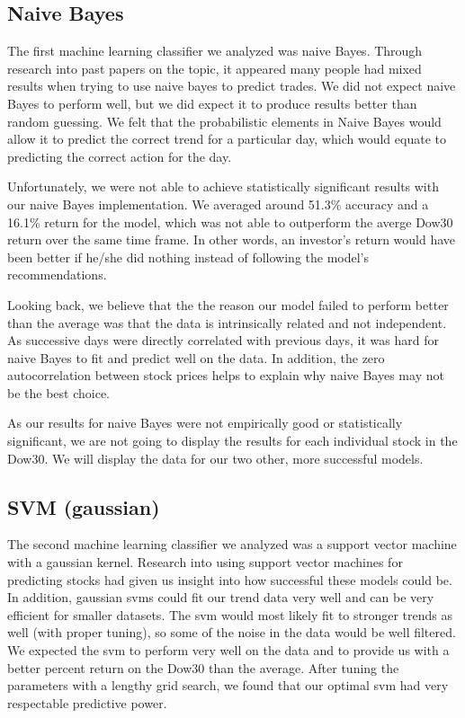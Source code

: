 \documentclass{article}
\begin{document}
\subsection{Naive Bayes}
The first machine learning classifier we analyzed was naive Bayes. Through research into past papers on the topic, it appeared many people had mixed results when trying to use naive bayes to predict trades. We did not expect naive Bayes to perform well, but we did expect it to produce results better than random guessing. We felt that the probabilistic elements in Naive Bayes would allow it to predict the correct trend for a particular day, which would equate to predicting the correct action for the day.

Unfortunately, we were not able to achieve statistically significant results with our naive Bayes implementation. We averaged around 51.3\% accuracy and a 16.1\% return for the model, which was not able to outperform the averge Dow30 return over the same time frame. In other words, an investor's return would have been better if he/she did nothing instead of following the model's recommendations.

Looking back, we believe that the the reason our model failed to perform better than the average was that the data is intrinsically related and not independent. As successive days were directly correlated with previous days, it was hard for naive Bayes to fit and predict well on the data. In addition, the zero autocorrelation between stock prices helps to explain why naive Bayes may not be the best choice.

As our results for naive Bayes were not empirically good or statistically significant, we are not going to display the results for each individual stock in the Dow30. We will display the data for our two other, more successful models.

\subsection{SVM (gaussian)}
The second machine learning classifier we analyzed was a support vector machine with a gaussian kernel. Research into using support vector machines for predicting stocks had given us insight into how successful these models could be. In addition, gaussian svms could fit our trend data very well and can be very efficient for smaller datasets. The svm would most likely fit to stronger trends as well (with proper tuning), so some of the noise in the data would be well filtered. We expected the svm to perform very well on the data and to provide us with a better percent return on the Dow30 than the average. After tuning the parameters with a lengthy grid search, we found that our optimal svm had very respectable predictive power.
\end{document}
